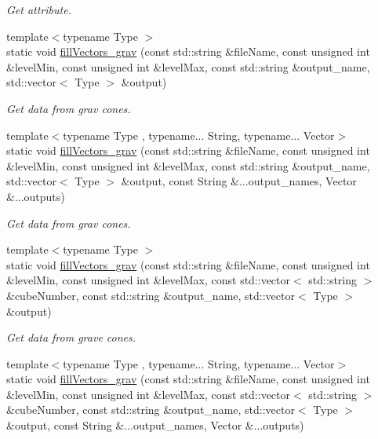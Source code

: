 \begin{DoxyCompactItemize}
\begin{DoxyCompactList}\small\item\em Get attribute. \end{DoxyCompactList}\item 
{\footnotesize template$<$typename Type $>$ }\\static void \hyperlink{classTReadHDF5_ac8924d0a0bde56d8007a75c9a7873d88}{fill\-Vectors\-\_\-grav} (const std\-::string \&file\-Name, const unsigned int \&level\-Min, const unsigned int \&level\-Max, const std\-::string \&output\-\_\-name, std\-::vector$<$ Type $>$ \&output)
\begin{DoxyCompactList}\small\item\em Get data from grav cones. \end{DoxyCompactList}\item 
{\footnotesize template$<$typename Type , typename... String, typename... Vector$>$ }\\static void \hyperlink{classTReadHDF5_a68d10bab126e3ba070e9f6f299ffa97b}{fill\-Vectors\-\_\-grav} (const std\-::string \&file\-Name, const unsigned int \&level\-Min, const unsigned int \&level\-Max, const std\-::string \&output\-\_\-name, std\-::vector$<$ Type $>$ \&output, const String \&...output\-\_\-names, Vector \&...outputs)
\begin{DoxyCompactList}\small\item\em Get data from grav cones. \end{DoxyCompactList}\item 
{\footnotesize template$<$typename Type $>$ }\\static void \hyperlink{classTReadHDF5_a8a481ac0eb5b56f9be58d4d22363858c}{fill\-Vectors\-\_\-grav} (const std\-::string \&file\-Name, const unsigned int \&level\-Min, const unsigned int \&level\-Max, const std\-::vector$<$ std\-::string $>$ \&cube\-Number, const std\-::string \&output\-\_\-name, std\-::vector$<$ Type $>$ \&output)
\begin{DoxyCompactList}\small\item\em Get data from grave cones. \end{DoxyCompactList}\item 
{\footnotesize template$<$typename Type , typename... String, typename... Vector$>$ }\\static void \hyperlink{classTReadHDF5_ab9b822c6a232ec91b869ccc7a363d157}{fill\-Vectors\-\_\-grav} (const std\-::string \&file\-Name, const unsigned int \&level\-Min, const unsigned int \&level\-Max, const std\-::vector$<$ std\-::string $>$ \&cube\-Number, const std\-::string \&output\-\_\-name, std\-::vector$<$ Type $>$ \&output, const String \&...output\-\_\-names, Vector \&...outputs)

\end{DoxyCompactItemize}
